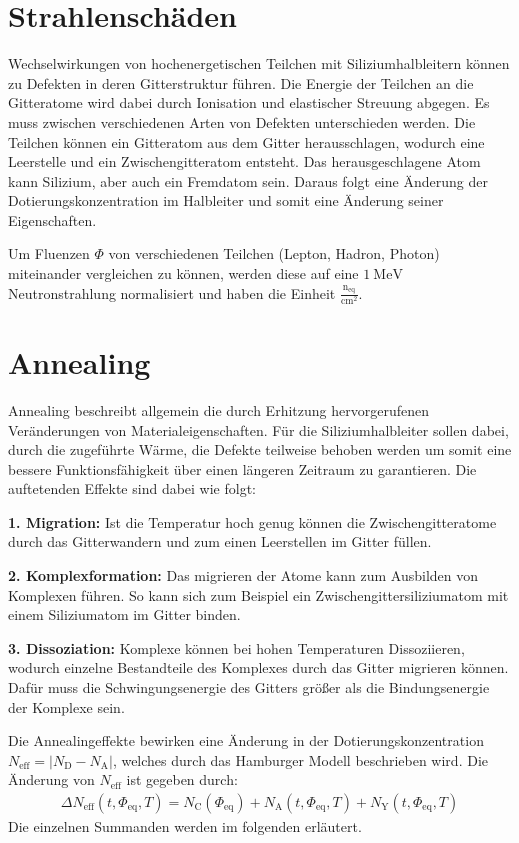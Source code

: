 \section{Strahlenschäden}
Wechselwirkungen von hochenergetischen Teilchen mit Siliziumhalbleitern können zu Defekten in deren
Gitterstruktur führen.
Die Energie der Teilchen an die Gitteratome wird dabei durch Ionisation und elastischer Streuung abgegen.
Es muss zwischen verschiedenen Arten von Defekten unterschieden werden. Die Teilchen können ein Gitteratom aus dem
Gitter herausschlagen, wodurch eine Leerstelle und ein Zwischengitteratom entsteht. Das herausgeschlagene Atom
kann Silizium, aber auch ein Fremdatom sein. Daraus folgt eine Änderung der Dotierungskonzentration im
Halbleiter und somit eine Änderung seiner Eigenschaften.

Um Fluenzen $ \Phi$ von verschiedenen Teilchen (Lepton, Hadron, Photon) miteinander vergleichen zu können, werden diese
auf eine $\SI{1}{\mega\eV}$ Neutronstrahlung normalisiert und haben die Einheit $\mathrm{\frac{n_{\mathrm{eq}}}{cm^2}}$.


\section{Annealing}
Annealing beschreibt allgemein die durch Erhitzung hervorgerufenen Veränderungen von Materialeigenschaften. Für die
Siliziumhalbleiter sollen dabei, durch die zugeführte Wärme, die Defekte teilweise behoben werden um somit eine
bessere Funktionsfähigkeit über einen längeren Zeitraum zu garantieren. Die auftetenden Effekte sind dabei wie folgt:

\textbf{1. Migration:} Ist die Temperatur hoch genug können die Zwischengitteratome durch das Gitterwandern und
zum einen Leerstellen im Gitter füllen.

\textbf{2. Komplexformation:} Das migrieren der Atome kann zum Ausbilden von Komplexen führen. So kann sich zum Beispiel ein
Zwischengittersiliziumatom mit einem Siliziumatom im Gitter binden.

\textbf{3. Dissoziation:} Komplexe können bei hohen Temperaturen Dissoziieren, wodurch einzelne Bestandteile des Komplexes
durch das Gitter migrieren können. Dafür muss die Schwingungsenergie des Gitters größer als die Bindungsenergie der Komplexe sein.

Die Annealingeffekte bewirken eine Änderung in der Dotierungskonzentration $N_{\mathrm{eff}}= |N_{\mathrm{D}}-N_{\mathrm{A}}|$, welches durch das Hamburger Modell beschrieben wird.
Die Änderung von $N_{\mathrm{eff}}$ ist gegeben durch:
\begin{align}
  \Delta N_{\mathrm{eff}}(t, \Phi_{\mathrm{eq}}, T)   = N_{\mathrm{C}}(\Phi_{\mathrm{eq}}) + N_{\mathrm{A}}(t, \Phi_{\mathrm{eq}}, T) + N_{\mathrm{Y}}(t, \Phi_{\mathrm{eq}}, T)
\end{align}
Die einzelnen Summanden werden im folgenden erläutert.

